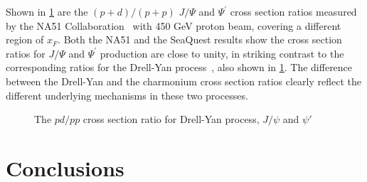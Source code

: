 \documentclass[reprint,aps,unsortedaddress,superscriptaddress,prd,floatfix,showpacs,linenumbers]{revtex4-2}
\begin{document}
Shown in \cref{fig:pd/pp_csr} are the $(p+d)/(p+p)$ $J/\Psi$
and $\Psi^\prime$ cross section
ratios measured by the NA51 Collaboration~\cite{abreu1998} with 450 GeV proton
beam, covering a different region of $x_F$. Both the NA51 and the SeaQuest
results show the cross section ratios for $J/\Psi$ and $\Psi^\prime$
production are close to unity, in striking contrast to
the corresponding ratios for the Drell-Yan process~\cite{dove2023}, also
shown in \cref{fig:pd/pp_csr}. The difference between the Drell-Yan and the charmonium
cross section ratios clearly reflect the different underlying mechanisms in
these two processes.
\begin{figure}
	\caption{The $pd/pp$ cross section ratio for Drell-Yan process, $J/\psi$ and $\psi'$}
	\label{fig:pd/pp_csr}
\end{figure}

\section{Conclusions}
\label{sec:Conclusions}

\nocite{*}

\end{document}
